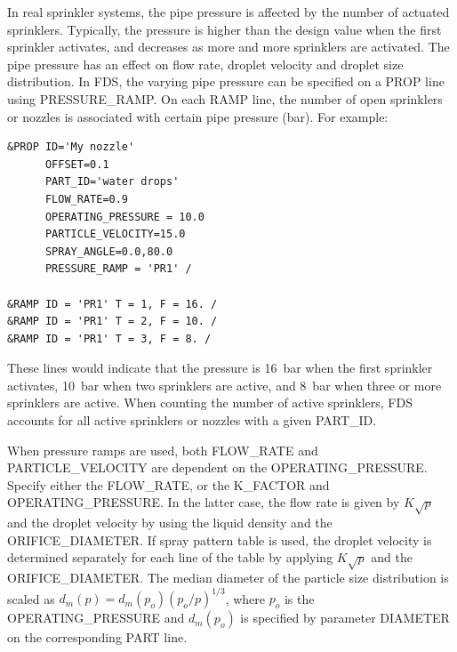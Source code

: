 \documentclass[11pt]{book}
\begin{document}
In real sprinkler systems, the pipe pressure is affected by the number of actuated sprinklers. Typically,
the pressure is higher than the design value when the first sprinkler activates, and decreases as more and more sprinklers are activated. The pipe pressure has an effect on flow rate,
droplet velocity and droplet size distribution. In FDS, the varying pipe pressure can be specified on a {\ct PROP} line using {\ct PRESSURE\_RAMP}. On each {\ct RAMP} line,
the number of open sprinklers or nozzles is associated with certain pipe pressure (bar). For example:

\begin{lstlisting}
&PROP ID='My nozzle'
      OFFSET=0.1
      PART_ID='water drops'
      FLOW_RATE=0.9
      OPERATING_PRESSURE = 10.0
      PARTICLE_VELOCITY=15.0
      SPRAY_ANGLE=0.0,80.0
      PRESSURE_RAMP = 'PR1' /

&RAMP ID = 'PR1' T = 1, F = 16. /
&RAMP ID = 'PR1' T = 2, F = 10. /
&RAMP ID = 'PR1' T = 3, F = 8. /
\end{lstlisting}
\noindent
These lines would indicate that the pressure is 16~bar when the first sprinkler activates, 10~bar when two sprinklers are active, and 8~bar when three or more sprinklers are active. When counting the number of active sprinklers, FDS accounts for all active sprinklers or nozzles with a given {\ct PART\_ID}.

When pressure ramps are used, both {\ct FLOW\_RATE} and {\ct PARTICLE\_VELOCITY} are dependent on the
{\ct OPERATING\_PRESSURE}. Specify either the {\ct FLOW\_RATE}, or the
{\ct K\_FACTOR} and {\ct OPERATING\_PRESSURE}. In the latter case, the flow rate is given by $K \sqrt{p}$ and the droplet velocity
by using the liquid density and the {\ct ORIFICE\_DIAMETER}.  If spray pattern table is used, the droplet velocity is determined separately for each line of the
table by applying $K\sqrt{p}$ and the {\ct ORIFICE\_DIAMETER}. The median diameter of the particle size distribution is scaled as
$d_m(p) = d_m(p_o)(p_o/p)^{1/3}$, where $p_o$ is the {\ct OPERATING\_PRESSURE}
and $d_m(p_o)$ is specified by parameter {\ct DIAMETER} on the corresponding {\ct PART} line.
\end{document}
